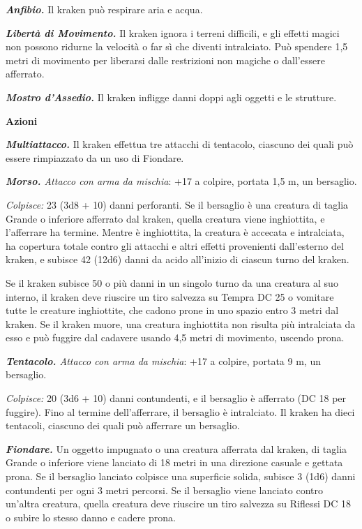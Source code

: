 \begin{multicols}{2}
\emph{\textbf{Anfibio.}} Il kraken può respirare aria e acqua.

\emph{\textbf{Libertà di Movimento.}} Il kraken ignora i terreni
difficili, e gli effetti magici non possono ridurne la velocità o far sì
che diventi intralciato. Può spendere 1,5 metri di movimento per
liberarsi dalle restrizioni non magiche o dall'essere afferrato.

\emph{\textbf{Mostro d'Assedio.}} Il kraken infligge danni doppi agli
oggetti e le strutture.

\textbf{Azioni}

\emph{\textbf{Multiattacco.}} Il kraken effettua tre attacchi di
tentacolo, ciascuno dei quali può essere rimpiazzato da un uso di
Fiondare.

\emph{\textbf{Morso.} Attacco con arma da mischia}: +17 a colpire,
portata 1,5 m, un bersaglio.

\emph{Colpisce:} 23 (3d8 + 10) danni perforanti. Se il bersaglio è una
creatura di taglia Grande o inferiore afferrato dal kraken, quella
creatura viene inghiottita, e l'afferrare ha termine. Mentre è
inghiottita, la creatura è accecata e intralciata, ha copertura totale
contro gli attacchi e altri effetti provenienti dall'esterno del kraken,
e subisce 42 (12d6) danni da acido all'inizio di ciascun turno del
kraken.

Se il kraken subisce 50 o più danni in un singolo turno da una creatura
al suo interno, il kraken deve riuscire un tiro salvezza su Tempra
DC 25 o vomitare tutte le creature inghiottite, che cadono prone in uno
spazio entro 3 metri dal kraken. Se il kraken muore, una creatura
inghiottita non risulta più intralciata da esso e può fuggire dal
cadavere usando 4,5 metri di movimento, uscendo prona.

\emph{\textbf{Tentacolo.} Attacco con arma da mischia}: +17 a colpire,
portata 9 m, un bersaglio.

\emph{Colpisce:} 20 (3d6 + 10) danni contundenti, e il bersaglio è
afferrato (DC 18 per fuggire). Fino al termine dell'afferrare, il
bersaglio è intralciato. Il kraken ha dieci tentacoli, ciascuno dei
quali può afferrare un bersaglio.

\emph{\textbf{Fiondare.}} Un oggetto impugnato o una creatura afferrata
dal kraken, di taglia Grande o inferiore viene lanciato di 18 metri in
una direzione casuale e gettata prona. Se il bersaglio lanciato colpisce
una superficie solida, subisce 3 (1d6) danni contundenti per ogni 3
metri percorsi. Se il bersaglio viene lanciato contro un'altra creatura,
quella creatura deve riuscire un tiro salvezza su Riflessi DC 18 o
subire lo stesso danno e cadere prona.


\end{multicols}
